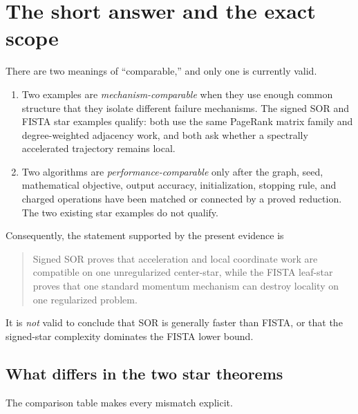 \section{The short answer and the exact scope}
\label{sec:scope-and-answer}

There are two meanings of ``comparable,'' and only one is currently valid.

\begin{enumerate}[leftmargin=*]
\item Two examples are \emph{mechanism-comparable} when they use enough common
      structure that they isolate different failure mechanisms.  The signed
      SOR and FISTA star examples qualify: both use the same PageRank matrix
      family and degree-weighted adjacency work, and both ask whether a
      spectrally accelerated trajectory remains local.
\item Two algorithms are \emph{performance-comparable} only after the graph,
      seed, mathematical objective, output accuracy, initialization, stopping
      rule, and charged operations have been matched or connected by a proved
      reduction.  The two existing star examples do not qualify.
\end{enumerate}

Consequently, the statement supported by the present evidence is
\begin{quote}
Signed SOR proves that acceleration and local coordinate work are compatible
on one unregularized center-star, while the FISTA leaf-star proves that one
standard momentum mechanism can destroy locality on one regularized problem.
\end{quote}
It is \emph{not} valid to conclude that SOR is generally faster than FISTA,
or that the signed-star complexity dominates the FISTA lower bound.

\subsection{What differs in the two star theorems}

The comparison table makes every mismatch explicit.

